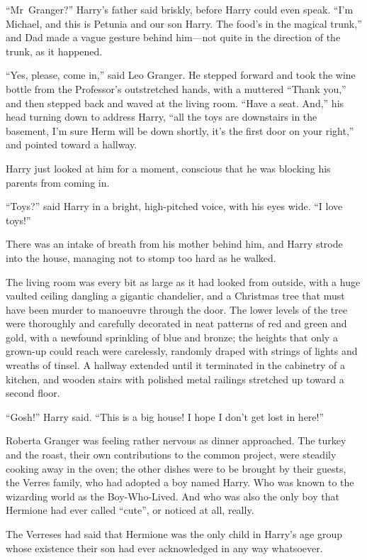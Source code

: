 “Mr~Granger?” Harry’s father said briskly, before Harry could even speak. “I’m Michael, and this is Petunia and our son Harry. The food’s in the magical trunk,” and Dad made a vague gesture behind him—not quite in the direction of the trunk, as it happened.

“Yes, please, come in,” said Leo Granger. He stepped forward and took the wine bottle from the Professor’s outstretched hands, with a muttered “Thank you,” and then stepped back and waved at the living room. “Have a seat. And,” his head turning down to address Harry, “all the toys are downstairs in the basement, I’m sure Herm will be down shortly, it’s the first door on your right,” and pointed toward a hallway.

Harry just looked at him for a moment, conscious that he was blocking his parents from coming in.

“Toys?” said Harry in a bright, high-pitched voice, with his eyes wide. “I love toys!”

There was an intake of breath from his mother behind him, and Harry strode into the house, managing not to stomp too hard as he walked.

The living room was every bit as large as it had looked from outside, with a huge vaulted ceiling dangling a gigantic chandelier, and a Christmas tree that must have been murder to manoeuvre through the door. The lower levels of the tree were thoroughly and carefully decorated in neat patterns of red and green and gold, with a newfound sprinkling of blue and bronze; the heights that only a grown-up could reach were carelessly, randomly draped with strings of lights and wreaths of tinsel. A hallway extended until it terminated in the cabinetry of a kitchen, and wooden stairs with polished metal railings stretched up toward a second floor.

“Gosh!” Harry said. “This is a big house! I hope I don’t get lost in here!”

\later

Roberta Granger was feeling rather nervous as dinner approached. The turkey and the roast, their own contributions to the common project, were steadily cooking away in the oven; the other dishes were to be brought by their guests, the Verres family, who had adopted a boy named Harry. Who was known to the wizarding world as the Boy-Who-Lived. And who was also the only boy that Hermione had ever called “cute”, or noticed at all, really.

The Verreses had said that Hermione was the only child in Harry’s age group whose existence their son had ever acknowledged in any way whatsoever.

